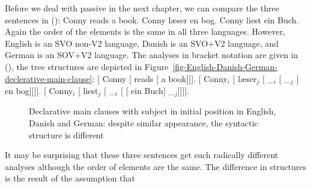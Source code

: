 Before we deal with passive in the next chapter, we can compare the three sentences in ():
\eal
\ex Conny reads a book.
\ex Conny læser en bog.
\ex Conny liest ein Buch.
\zl
Again the order of the elements is the same in all three languages. However, English is an SVO
non-V2 language, Danish is an SVO+V2 language, and German is an SOV+V2 language. The analyses in
bracket notation are given in (), the tree structures are depicted in Figure~\vref{fig-English-Danish-German-declerative-main-clause}:
\eal
\ex {}[ Conny [ reads [ a book]]].
\ex {}[ Conny$_i$ [ læser$_j$ [ \_$_i$ [  \_$_j$ [ en bog]]]].
\ex {}[ Conny$_i$ [ liest$_j$ [ \_$_i$ [\sub{\vbar} [ ein Buch] \_$_j$]]]].
\zl
\begin{figure}
\scalebox{.8}{%
\begin{forest}
sm edges
[S
  [NP [Conny]]
  [VP
    [V [reads]]
    [NP [a book,baseline,roof]]]]
\end{forest}}
\hfill
{}
\hfill
{}
\caption{\label{fig-English-Danish-German-declerative-main-clause}Declarative main clauses with
  subject in initial position in English, Danish and German: despite similar appearance, the
  syntactic structure is different}
\end{figure}
It may be surprising that these three sentences get such radically different analyses although the
order of elements are the same. The difference in structures is the result of the assumption that
